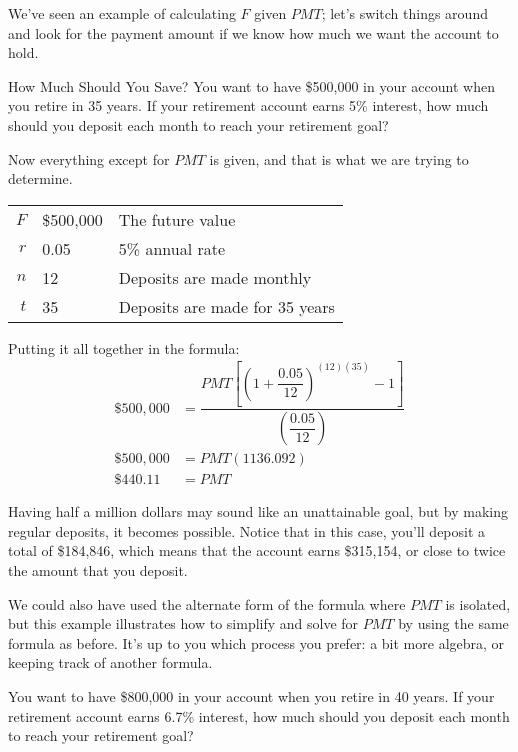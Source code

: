 We've seen an example of calculating $F$ given $PMT$; let's switch things around and look for the payment amount if we know how much we want the account to hold.

\begin{example}[https://www.youtube.com/watch?v=TWZhZoh9TG4]{How Much Should You Save?}
You want to have \$500,000 in your account when you retire in 35 years.  If your retirement account earns 5\% interest, how much should you deposit each month to reach your retirement goal?

\sol
Now everything except for $PMT$ is given, and that is what we are trying to determine.
\begin{center}
\begin{tabular}{r l l}
$F$ & \$500,000 & The future value\\
$r$ & 0.05 & 5\% annual rate\\
$n$ & 12 & Deposits are made monthly\\
$t$ & 35 & Deposits are made for 35 years
\end{tabular}
\end{center}

Putting it all together in the formula:
\begin{align*}
\$500,000 &= \dfrac{PMT\left[\left(1+\dfrac{0.05}{12}\right)^{(12)(35)}-1\right]}{\left(\dfrac{0.05}{12}\right)}\\
\$500,000 &= PMT(1136.092)\\
\boxed{\$440.11} &= PMT
\end{align*}

Having half a million dollars may sound like an unattainable goal, but by making regular deposits, it becomes possible.  Notice that in this case, you'll deposit a total of \$184,846, which means that the account earns \$315,154, or close to twice the amount that you deposit.
\end{example}

We could also have used the alternate form of the formula where $PMT$ is isolated, but this example illustrates how to simplify and solve for $PMT$ by using the same formula as before.  It's up to you which process you prefer: a bit more algebra, or keeping track of another formula.

\begin{try}
You want to have \$800,000 in your account when you retire in 40 years.  If your retirement account earns 6.7\% interest, how much should you deposit each month to reach your retirement goal?
\end{try}


